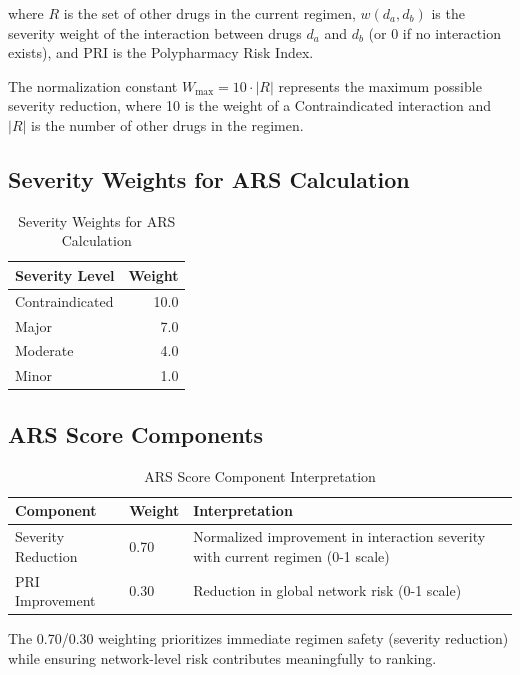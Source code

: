 \documentclass[11pt,a4paper]{article}
\begin{document}
where $R$ is the set of other drugs in the current regimen, $w(d_a, d_b)$ is the severity weight of the interaction between drugs $d_a$ and $d_b$ (or 0 if no interaction exists), and PRI is the Polypharmacy Risk Index.

The normalization constant $W_{\text{max}} = 10 \cdot |R|$ represents the maximum possible severity reduction, where 10 is the weight of a Contraindicated interaction and $|R|$ is the number of other drugs in the regimen.

\subsection{Severity Weights for ARS Calculation}

\begin{table}[H]
\centering
\caption{Severity Weights for ARS Calculation}
\label{tab:severity_weights}
\begin{tabular}{lr}
\toprule
\textbf{Severity Level} & \textbf{Weight} \\
\midrule
Contraindicated & 10.0 \\
Major & 7.0 \\
Moderate & 4.0 \\
Minor & 1.0 \\
\bottomrule
\end{tabular}
\end{table}

\subsection{ARS Score Components}

\begin{table}[H]
\centering
\caption{ARS Score Component Interpretation}
\label{tab:ars_components}
\begin{tabular}{llp{7cm}}
\toprule
\textbf{Component} & \textbf{Weight} & \textbf{Interpretation} \\
\midrule
Severity Reduction & 0.70 & Normalized improvement in interaction severity with current regimen (0-1 scale) \\
PRI Improvement & 0.30 & Reduction in global network risk (0-1 scale) \\
\bottomrule
\end{tabular}
\end{table}

The 0.70/0.30 weighting prioritizes immediate regimen safety (severity reduction) while ensuring network-level risk contributes meaningfully to ranking.
\end{document}
